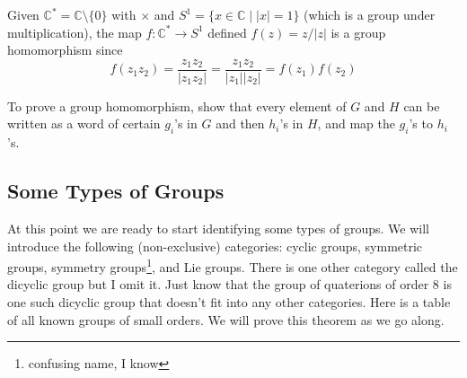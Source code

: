   \begin{example}
    Given $\mathbb{C}^\ast = \mathbb{C} \setminus \{0\}$ with $\times$ and $S^1 = \{x \in \mathbb{C} \mid |x| = 1\}$ (which is a group under multiplication), the map $f: \mathbb{C}^\ast \rightarrow S^1$ defined $f(z) = z/|z|$ is a group homomorphism since 
    \begin{equation}
      f(z_1 z_2) = \frac{z_1 z_2}{|z_1 z_2|} = \frac{z_1 z_2}{|z_1| |z_2|} = f(z_1) f(z_2)
    \end{equation}
  \end{example} 

  \begin{theorem}[Tip]
    To prove a group homomorphism, show that every element of $G$ and $H$ can be written as a word of certain $g_i$'s in $G$ and then $h_i$'s in $H$, and map the $g_i$'s to $h_i$'s. 
  \end{theorem}

\subsection{Some Types of Groups} 

  At this point we are ready to start identifying some types of groups. We will introduce the following (non-exclusive) categories: cyclic groups, symmetric groups, symmetry groups\footnote{confusing name, I know}, and Lie groups. There is one other category called the dicyclic group but I omit it. Just know that the group of quaterions of order $8$ is one such dicyclic group that doesn't fit into any other categories. Here is a table of all known groups of small orders. We will prove this theorem as we go along. 

